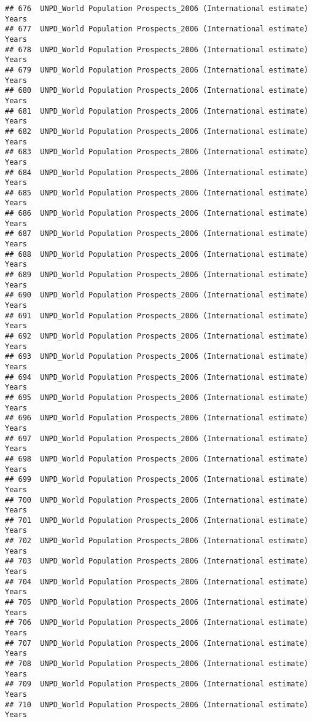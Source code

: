 \documentclass[]{article}
\begin{document}
\begin{verbatim}
## 676  UNPD_World Population Prospects_2006 (International estimate) Years
## 677  UNPD_World Population Prospects_2006 (International estimate) Years
## 678  UNPD_World Population Prospects_2006 (International estimate) Years
## 679  UNPD_World Population Prospects_2006 (International estimate) Years
## 680  UNPD_World Population Prospects_2006 (International estimate) Years
## 681  UNPD_World Population Prospects_2006 (International estimate) Years
## 682  UNPD_World Population Prospects_2006 (International estimate) Years
## 683  UNPD_World Population Prospects_2006 (International estimate) Years
## 684  UNPD_World Population Prospects_2006 (International estimate) Years
## 685  UNPD_World Population Prospects_2006 (International estimate) Years
## 686  UNPD_World Population Prospects_2006 (International estimate) Years
## 687  UNPD_World Population Prospects_2006 (International estimate) Years
## 688  UNPD_World Population Prospects_2006 (International estimate) Years
## 689  UNPD_World Population Prospects_2006 (International estimate) Years
## 690  UNPD_World Population Prospects_2006 (International estimate) Years
## 691  UNPD_World Population Prospects_2006 (International estimate) Years
## 692  UNPD_World Population Prospects_2006 (International estimate) Years
## 693  UNPD_World Population Prospects_2006 (International estimate) Years
## 694  UNPD_World Population Prospects_2006 (International estimate) Years
## 695  UNPD_World Population Prospects_2006 (International estimate) Years
## 696  UNPD_World Population Prospects_2006 (International estimate) Years
## 697  UNPD_World Population Prospects_2006 (International estimate) Years
## 698  UNPD_World Population Prospects_2006 (International estimate) Years
## 699  UNPD_World Population Prospects_2006 (International estimate) Years
## 700  UNPD_World Population Prospects_2006 (International estimate) Years
## 701  UNPD_World Population Prospects_2006 (International estimate) Years
## 702  UNPD_World Population Prospects_2006 (International estimate) Years
## 703  UNPD_World Population Prospects_2006 (International estimate) Years
## 704  UNPD_World Population Prospects_2006 (International estimate) Years
## 705  UNPD_World Population Prospects_2006 (International estimate) Years
## 706  UNPD_World Population Prospects_2006 (International estimate) Years
## 707  UNPD_World Population Prospects_2006 (International estimate) Years
## 708  UNPD_World Population Prospects_2006 (International estimate) Years
## 709  UNPD_World Population Prospects_2006 (International estimate) Years
## 710  UNPD_World Population Prospects_2006 (International estimate) Years

\end{verbatim}
\end{document}
